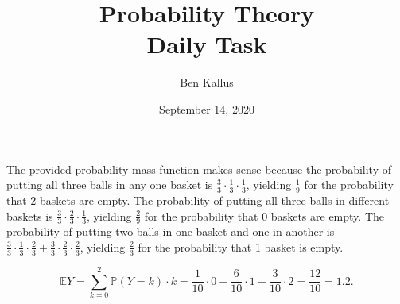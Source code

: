 \documentclass[12pt]{article}
\title{Probability Theory \\ Daily Task}
\author{Ben Kallus}
\date{September 14, 2020}
\begin{document}
\maketitle

The provided probability mass function makes sense because the probability of putting all three balls in any one basket is $\frac33 \cdot \frac13 \cdot \frac13$, yielding $\frac19$ for the probability that 2 baskets are empty. The probability of putting all three balls in different baskets is $\frac33 \cdot \frac23 \cdot \frac13$, yielding $\frac29$ for the probability that 0 baskets are empty. The probability of putting two balls in one basket and one in another is $\frac33 \cdot \frac13 \cdot \frac23 + \frac33 \cdot \frac23 \cdot \frac23$, yielding $\frac23$ for the probability that 1 basket is empty.

$$\mathbb EY = \sum_{k=0}^2 \mathbb P(Y = k) \cdot k = \frac1{10} \cdot 0 + \frac6{10} \cdot 1 + \frac3{10}\cdot 2 = \frac{12}{10} = 1.2.$$
\end{document}
